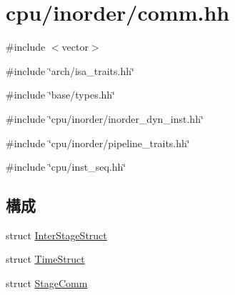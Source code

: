 \hypertarget{inorder_2comm_8hh}{
\section{cpu/inorder/comm.hh}
\label{inorder_2comm_8hh}
}
{\ttfamily \#include $<$vector$>$}\par
{\ttfamily \#include \char`\"{}arch/isa\_\-traits.hh\char`\"{}}\par
{\ttfamily \#include \char`\"{}base/types.hh\char`\"{}}\par
{\ttfamily \#include \char`\"{}cpu/inorder/inorder\_\-dyn\_\-inst.hh\char`\"{}}\par
{\ttfamily \#include \char`\"{}cpu/inorder/pipeline\_\-traits.hh\char`\"{}}\par
{\ttfamily \#include \char`\"{}cpu/inst\_\-seq.hh\char`\"{}}\par
\subsection*{構成}
\begin{DoxyCompactItemize}
\item 
struct \hyperlink{structInterStageStruct}{InterStageStruct}
\item 
struct \hyperlink{structTimeStruct}{TimeStruct}
\item 
struct \hyperlink{structTimeStruct_1_1StageComm}{StageComm}
\end{DoxyCompactItemize}
